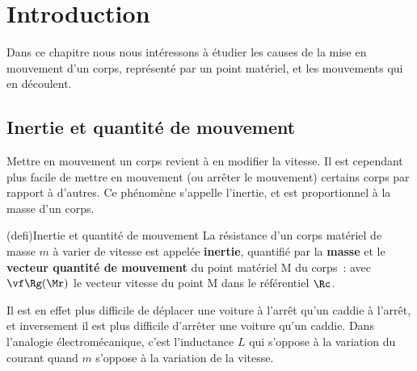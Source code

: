 \documentclass[../../main/main.tex]{subfiles}
\begin{document}
\newpage

\section{Introduction}
Dans ce chapitre nous nous intéressons à étudier les causes de la mise en
mouvement d'un corps, représenté par un point matériel, et les mouvements qui en
découlent.

\subsection{Inertie et quantité de mouvement}
Mettre en mouvement un corps revient à en modifier la vitesse. Il est cependant
plus facile de mettre en mouvement (ou arrêter le mouvement) certains corps par
rapport à d'autres. Ce phénomène s'appelle l'inertie, et est
proportionnel à la masse d'un corps.

\begin{tcb*}(defi){Inertie et quantité de mouvement}
	La résistance d'un corps matériel de masse $m$ à varier de vitesse est
	appelée \textbf{inertie}, quantifié par la \textbf{masse} et le
	\textbf{vecteur quantité de mouvement} du point matériel M du corps~:
	\psw{
		\[
			\boxed{\pf\Rg(\Mr) = m\vf\Rg(\Mr)}
		\]
	}
	avec $\vf\Rg(\Mr)$ le vecteur vitesse du point M dans le référentiel $\Rc$.
\end{tcb*}

Il est en effet plus difficile de déplacer une voiture à l'arrêt qu'un caddie à
l'arrêt, et inversement il est plus difficile d'arrêter une voiture qu'un
caddie. Dans l'analogie électromécanique, c'est l'inductance $L$ qui s'oppose à
la variation du courant quand $m$ s'oppose à la variation de la vitesse.
\end{document}
